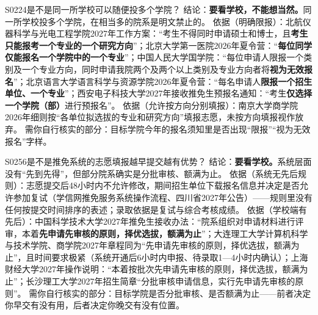 \begin{qa}{S0224}{是不是同一所学校可以随便投多个学院？}
结论：\textbf{要看学校，不能想当然。}同一所学校投多个学院，在相当多的院系是明文禁止的。
依据（明确限报）：北航仪器科学与光电工程学院2027年工作方案：“考生不得同时申请硕士和博士，且\textbf{考生只能报考一个专业的一个研究方向}”；北京大学第一医院2026年夏令营：“\textbf{每位同学仅能报名一个学院中的一个专业}”；中国人民大学国学院：“每位申请人限报一个类别及一个专业方向，同时申请我院两个及两个以上类别及专业方向者将\textbf{视为无效报名}”；北京语言大学语言科学与资源学院2026年夏令营：“每名申请人\textbf{限报一个招生单位、一个专业}”；西安电子科技大学2027年接收推免生预报名通知：“考生\textbf{仅选择一个学院（部）}进行预报名”。
依据（允许按方向分别填报）：南京大学商学院2026年细则按“各单位拟选拔的专业和研究方向”填报志愿，未按方向填报视作放弃。
需你自行核实的部分：目标学院今年的报名须知里是否出现“限报”“视为无效报名”字样。
\end{qa}

\begin{qa}{S0256}{是不是推免系统的志愿填报越早提交越有优势？}
结论：\textbf{要看学校。}系统层面没有“先到先得”，但部分院系确实是分批审核、额满为止。
依据（系统无先后规则）：志愿提交后48小时内不允许修改，期间招生单位下载报名信息并决定是否允许参加复试（学信网推免服务系统操作流程、四川省2027年公告）——规则里没有任何按提交时间排序的表述；录取依据是复试与综合考核成绩。
依据（学校端有先后）：中国科学技术大学2027年推免生接收办法：“院系组织对申请材料进行评审，本着\textbf{先申请先审核的原则，择优选拔，额满为止}”；大连理工大学计算机科学与技术学院、商学院2027年章程同为“先申请先审核的原则，择优选拔，额满为止”，且时间要求极紧（系统开通后6小时内申报、待录取1—4小时内确认）；上海财经大学2027年操作说明：“本着按批次先申请先审核的原则，择优选拔，额满为止”；长沙理工大学2027年招生简章“分批审核申请信息，实行先申请先审核的原则”。
需你自行核实的部分：目标学院是否分批审核、是否额满为止——前者决定你早交有没有用，后者决定你晚交有没有位置。
\end{qa}

